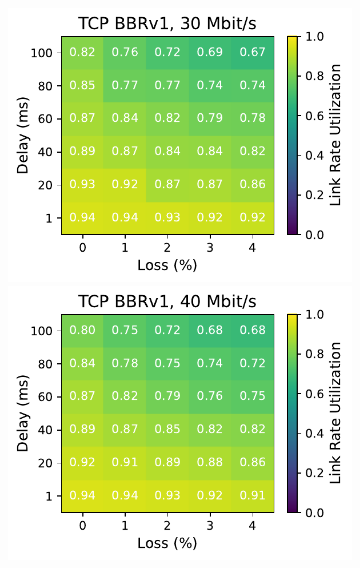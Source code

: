 \begin{figure}[ht]
\begin{subfigure}[b]{0.22\linewidth}
        \includegraphics[width=\linewidth,trim={0 0 2cm 0},clip]{splitting/figures/heatmaps/heatmap_tcp_bbr1_30mbps.pdf}
        \includegraphics[width=\linewidth,trim={0 0 2cm 0},clip]{splitting/figures/heatmaps/heatmap_tcp_bbr1_40mbps.pdf}

\end{subfigure}
\end{figure}
